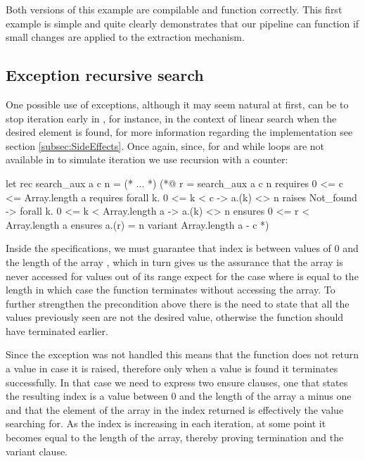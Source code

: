 Both versions of this example are compilable and function correctly. This first example is simple and quite clearly demonstrates that
our pipeline can function if small changes are applied to the extraction mechanism.

\subsection{Exception recursive search}

One possible use of exceptions, although it may seem natural at first, can be to stop iteration early in \ocaml, for instance, in the 
context of linear search when the desired element is found, for more information regarding the implementation see section 
\ref{subsec:SideEffects}. Once again, since, for and while loops are not available in \cml to simulate iteration we use recursion 
with a counter:

\begin{gospell}
let rec search_aux a c n = (* ... *)
(*@
  r = search_aux a c n
  requires 0 <= c <= Array.length a
  requires forall k. 0 <= k < c -> a.(k) <> n
  raises Not_found -> forall k. 0 <= k < Array.length a -> a.(k) <> n
  ensures 0 <= r < Array.length a
  ensures a.(r) = n
  variant Array.length a - c
*)
\end{gospell}

Inside the \gospel specifications, we must guarantee that index  is between values of 0 and the length of the array 
, which in turn gives us the assurance that the array is never accessed for values out of its range expect for the case 
where  is equal to the length in which case the function terminates without accessing the array. To further strengthen the
precondition above there is the need to state that all the values previously seen are not the desired value, otherwise the function
should have terminated earlier.

Since the exception  was not handled this means that the function does not return a value in case it is raised,
therefore only when a value is found it terminates successfully. In that case we need to express two ensure clauses, one that states 
the resulting index is a value between 0 and the length of the array a minus one and that the element of the array in the index returned 
is effectively the value searching for. As the index is increasing in each iteration, at some point it becomes equal to the length of the 
array, thereby proving termination and the variant clause.

